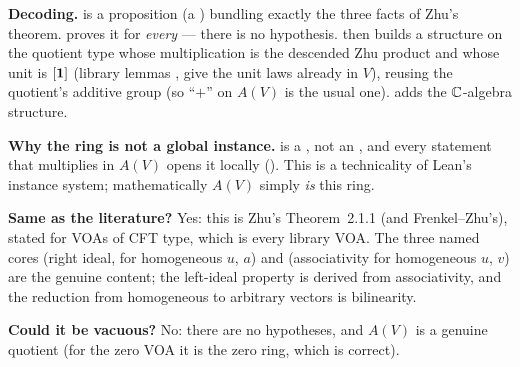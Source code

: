 \begin{dictionary}
\textbf{Decoding.}  is a proposition (a ) bundling exactly the
three facts of Zhu's theorem.  proves it for \emph{every}  --- there is no
hypothesis.  then builds a  structure on the quotient type  whose
multiplication is the descended Zhu product and whose unit is $[\mathbf{1}]$ (library lemmas
,  give the unit laws already in $V$), reusing the quotient's
additive group (so ``$+$'' on $A(V)$ is the usual one).  adds the ${\mathbb{C}}$-algebra structure.

\textbf{Why the ring is not a global instance.}  is a , not an , and
every statement that multiplies in $A(V)$ opens it locally (). This is a technicality
of Lean's instance system; mathematically $A(V)$ simply \emph{is} this ring.

\textbf{Same as the literature?} Yes: this is Zhu's Theorem~2.1.1 (and Frenkel--Zhu's), stated for VOAs of CFT
type, which is every library VOA. The three named cores  (right ideal, for
homogeneous $u$, $a$) and  (associativity for homogeneous $u$, $v$) are the genuine
content; the left-ideal property is derived from associativity, and the reduction from homogeneous to arbitrary
vectors is bilinearity.

\textbf{Could it be vacuous?} No: there are no hypotheses, and $A(V)$ is a genuine quotient (for the zero
VOA it is the zero ring, which is correct).
\end{dictionary}

